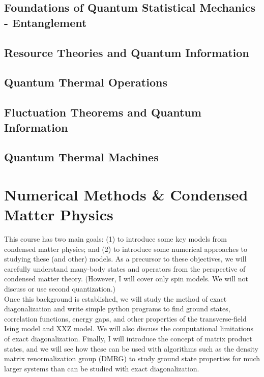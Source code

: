 \documentclass{book}
\theoremstyle{definition}
\begin{document}
\newpage

\section{Foundations of Quantum Statistical Mechanics - Entanglement}
\newpage

\section{Resource Theories and Quantum Information}


\newpage
\section{Quantum Thermal Operations}


\newpage
\section{Fluctuation Theorems and Quantum Information}


\newpage
\section{Quantum Thermal Machines}






\newpage
\chapter{Numerical Methods \& Condensed Matter Physics}

This course has two main goals: (1) to introduce some key models from condensed matter physics; and (2) to introduce some numerical approaches to studying these (and other) models.  As a precursor to these objectives, we will carefully understand many-body states and operators from the perspective of condensed matter theory.  (However, I will cover only spin models.  We will not discuss or use second quantization.)\\



Once this background is established, we will study the method of exact diagonalization and write simple python programs to find ground states, correlation functions, energy gaps, and other properties of the transverse-field Ising model and XXZ model.  We will also discuss the computational limitations of exact diagonalization.  Finally, I will introduce the concept of matrix product states, and we will see how these can be used with algorithms such as the density matrix renormalization group (DMRG) to study ground state properties for much larger systems than can be studied with exact diagonalization.
\end{document}
